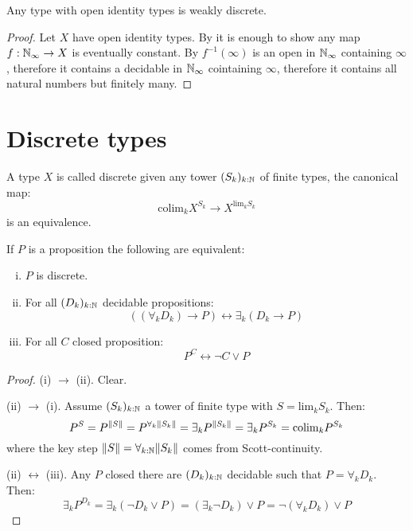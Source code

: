 \begin{lemma}
Any type with open identity types is weakly discrete.
\end{lemma}

\begin{proof}
Let $X$ have open identity types. By  it is enough to show any map $f:\mathbb{N}_{\infty}\to X$ is eventually constant. By $f^{-1}(\infty)$ is an open in $\mathbb{N}_{\infty}$ containing $\infty$, therefore it contains a decidable in $\mathbb{N}_{\infty}$ cointaining $\infty$, therefore it contains all natural numbers but finitely many.
\end{proof}


\section{Discrete types}

\begin{definition}
A type $X$ is called discrete given any tower $(S_k)_{k:\mathbb{N}}$ of finite types, the canonical map:
\[\mathrm{colim}_kX^{S_k} \to X^{\mathrm{lim}_kS_k}\]
is an equivalence.
\end{definition}

\begin{lemma}\label{proposition-discrete}
If $P$ is a proposition the following are equivalent:
\begin{enumerate}[(i)]
\item $P$ is discrete.
\item For all $(D_k)_{k:\mathbb{N}}$ decidable propositions:
\[((\forall_kD_k)\to P) \leftrightarrow \exists_k(D_k\to P)\]
\item For all $C$ closed proposition:
\[P^C \leftrightarrow \neg C\lor P\]
\end{enumerate}
\end{lemma}

\begin{proof}
(i) $\to$ (ii). Clear.

(ii) $\to$ (i). Assume $(S_k)_{k:\mathbb{N}}$ a tower of finite type with $S=\mathrm{lim}_kS_k$. Then:
\[P^S = P^{\lVert S \rVert} = P^{\forall_{k}\lVert S_k \rVert} = \exists_{k} P^{\lVert S_k \rVert} = \exists_{k} P^{S_k} = \mathrm{colim}_kP^{S_k}\]
where the key step $\lVert S \rVert = \forall_{k:\mathbb{N}}\lVert S_k \rVert$ comes from Scott-continuity.

(ii) $\leftrightarrow$ (iii). Any $P$ closed there are $(D_k)_{k:\mathbb{N}}$ decidable such that $P = \forall_kD_k$. Then:
\[\exists_k P^{D_k} = \exists_k (\neg D_k\lor P) = (\exists_k\neg D_k)\lor P = \neg (\forall_kD_k)\lor P\] 
\end{proof}

